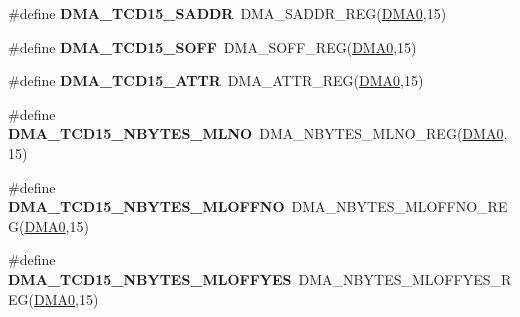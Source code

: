 \begin{DoxyCompactItemize}
\item 
\#define {\bfseries D\+M\+A\+\_\+\+T\+C\+D15\+\_\+\+S\+A\+D\+DR}~D\+M\+A\+\_\+\+S\+A\+D\+D\+R\+\_\+\+R\+EG(\hyperlink{group__DMA__Peripheral__Access__Layer_ga4103044f9ca209772f513dc694513ffb}{D\+M\+A0},15)\hypertarget{group__DMA__Register__Accessor__Macros_ga6eb79f13370be67b54b5ed1fe461adc6}{}\label{group__DMA__Register__Accessor__Macros_ga6eb79f13370be67b54b5ed1fe461adc6}

\item 
\#define {\bfseries D\+M\+A\+\_\+\+T\+C\+D15\+\_\+\+S\+O\+FF}~D\+M\+A\+\_\+\+S\+O\+F\+F\+\_\+\+R\+EG(\hyperlink{group__DMA__Peripheral__Access__Layer_ga4103044f9ca209772f513dc694513ffb}{D\+M\+A0},15)\hypertarget{group__DMA__Register__Accessor__Macros_gaa9109e0dee0d1aa8b467ef00c70f2971}{}\label{group__DMA__Register__Accessor__Macros_gaa9109e0dee0d1aa8b467ef00c70f2971}

\item 
\#define {\bfseries D\+M\+A\+\_\+\+T\+C\+D15\+\_\+\+A\+T\+TR}~D\+M\+A\+\_\+\+A\+T\+T\+R\+\_\+\+R\+EG(\hyperlink{group__DMA__Peripheral__Access__Layer_ga4103044f9ca209772f513dc694513ffb}{D\+M\+A0},15)\hypertarget{group__DMA__Register__Accessor__Macros_ga51d5b5ee407c0a940461edc68f69bea3}{}\label{group__DMA__Register__Accessor__Macros_ga51d5b5ee407c0a940461edc68f69bea3}

\item 
\#define {\bfseries D\+M\+A\+\_\+\+T\+C\+D15\+\_\+\+N\+B\+Y\+T\+E\+S\+\_\+\+M\+L\+NO}~D\+M\+A\+\_\+\+N\+B\+Y\+T\+E\+S\+\_\+\+M\+L\+N\+O\+\_\+\+R\+EG(\hyperlink{group__DMA__Peripheral__Access__Layer_ga4103044f9ca209772f513dc694513ffb}{D\+M\+A0},15)\hypertarget{group__DMA__Register__Accessor__Macros_ga88b7235ecd3b35d9a897ff174187fc8a}{}\label{group__DMA__Register__Accessor__Macros_ga88b7235ecd3b35d9a897ff174187fc8a}

\item 
\#define {\bfseries D\+M\+A\+\_\+\+T\+C\+D15\+\_\+\+N\+B\+Y\+T\+E\+S\+\_\+\+M\+L\+O\+F\+F\+NO}~D\+M\+A\+\_\+\+N\+B\+Y\+T\+E\+S\+\_\+\+M\+L\+O\+F\+F\+N\+O\+\_\+\+R\+EG(\hyperlink{group__DMA__Peripheral__Access__Layer_ga4103044f9ca209772f513dc694513ffb}{D\+M\+A0},15)\hypertarget{group__DMA__Register__Accessor__Macros_ga60e6538f7c7033e20c33a8a09b5748fe}{}\label{group__DMA__Register__Accessor__Macros_ga60e6538f7c7033e20c33a8a09b5748fe}

\item 
\#define {\bfseries D\+M\+A\+\_\+\+T\+C\+D15\+\_\+\+N\+B\+Y\+T\+E\+S\+\_\+\+M\+L\+O\+F\+F\+Y\+ES}~D\+M\+A\+\_\+\+N\+B\+Y\+T\+E\+S\+\_\+\+M\+L\+O\+F\+F\+Y\+E\+S\+\_\+\+R\+EG(\hyperlink{group__DMA__Peripheral__Access__Layer_ga4103044f9ca209772f513dc694513ffb}{D\+M\+A0},15)\hypertarget{group__DMA__Register__Accessor__Macros_ga95fb2cb3eb8f170bf832c7b018a96ec5}{}\label{group__DMA__Register__Accessor__Macros_ga95fb2cb3eb8f170bf832c7b018a96ec5}


\end{DoxyCompactItemize}
